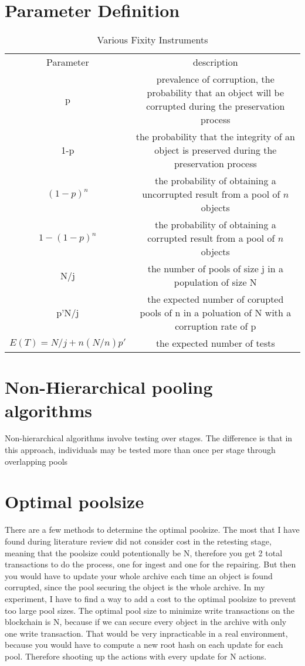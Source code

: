 \section{Parameter Definition}
\begin{table}[t]
    \centering
    \caption{Various Fixity Instruments \cite[6]{ndsa2017fixity}}
    \label{tb:fixity-instruments}
    \begin{tabular}{ c c }
        Parameter     &  description \\
        p     &  prevalence of corruption, the probability that an object will be corrupted during the preservation process \\
        1-p   &  the probability that the integrity of an object is preserved during the preservation process \\   
        $(1-p)^n$ &  the probability of obtaining a uncorrupted result from a pool of $n$ objects \\  
        $1 - (1-p)^n$ &  the probability of obtaining a corrupted result from a pool of $n$ objects \\  
        N/j & the number of pools of size j in a population of size N \\  
        p'N/j & the expected number of corupted pools of n in a poluation of N with a corruption rate of p \\  
        $E(T) = N/j + n(N/n)p'$ & the expected number of tests 
    \end{tabular}
\end{table}
\cite[3]{dorfman1943detection}
\section{Non-Hierarchical pooling algorithms}
Non-hierarchical algorithms involve testing over stages. The difference is that in this approach, individuals may be tested more than once per stage through overlapping pools \cite[3]{lagopati2021sample}
\section{Optimal poolsize}
There are a few methods to determine the optimal poolsize. The most that I have found during literature review did not consider cost in the retesting stage, meaning that the poolsize could potentionally be N, therefore you get 2 total transactions to do the process, one for ingest and one for the repairing. But then you would have to update your whole archive each time an object is found corrupted, since the pool securing the object is the whole archive. In my experiment, I have to find a way to add a cost to the optimal poolsize to prevent too large pool sizes.
The optimal pool size to minimize write transactions on the blockchain is N, because if we can secure every object in the archive with only one write transaction. That would be very inpracticable in a real environment, because you would have to compute a new root hash on each update for each pool. Therefore shooting up the actions with every update for N actions.
 